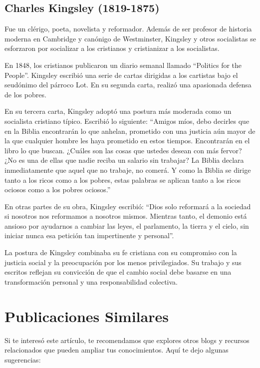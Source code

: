 \documentclass[
  a4paper,
]{article}
\begin{document}
\hypertarget{charles-kingsley-1819-1875}{%
\subsection{Charles Kingsley
(1819-1875)}\label{charles-kingsley-1819-1875}}

Fue un clérigo, poeta, novelista y reformador. Además de ser profesor de
historia moderna en Cambridge y canónigo de Westminster, Kingsley y
otros socialistas se esforzaron por socializar a los cristianos y
cristianizar a los socialistas.

En 1848, los cristianos publicaron un diario semanal llamado ``Politics
for the People''. Kingsley escribió una serie de cartas dirigidas a los
cartistas bajo el seudónimo del párroco Lot. En su segunda carta,
realizó una apasionada defensa de los pobres.

En su tercera carta, Kingsley adoptó una postura más moderada como un
socialista cristiano típico. Escribió lo siguiente: ``Amigos míos, debo
decirles que en la Biblia encontrarán lo que anhelan, prometido con una
justicia aún mayor de la que cualquier hombre les haya prometido en
estos tiempos. Encontrarán en el libro lo que buscan. ¿Cuáles son las
cosas que ustedes desean con más fervor? ¿No es una de ellas que nadie
reciba un salario sin trabajar? La Biblia declara inmediatamente que
aquel que no trabaje, no comerá. Y como la Biblia se dirige tanto a los
ricos como a los pobres, estas palabras se aplican tanto a los ricos
ociosos como a los pobres ociosos.''

En otras partes de su obra, Kingsley escribió: ``Dios solo reformará a
la sociedad si nosotros nos reformamos a nosotros mismos. Mientras
tanto, el demonio está ansioso por ayudarnos a cambiar las leyes, el
parlamento, la tierra y el cielo, sin iniciar nunca esa petición tan
impertinente y personal''.

La postura de Kingsley combinaba su fe cristiana con su compromiso con
la justicia social y la preocupación por los menos privilegiados. Su
trabajo y sus escritos reflejan su convicción de que el cambio social
debe basarse en una transformación personal y una responsabilidad
colectiva.

\hypertarget{publicaciones-similares}{%
\section{Publicaciones Similares}\label{publicaciones-similares}}

Si te interesó este artículo, te recomendamos que explores otros blogs y
recursos relacionados que pueden ampliar tus conocimientos. Aquí te dejo
algunas sugerencias:
\end{document}
